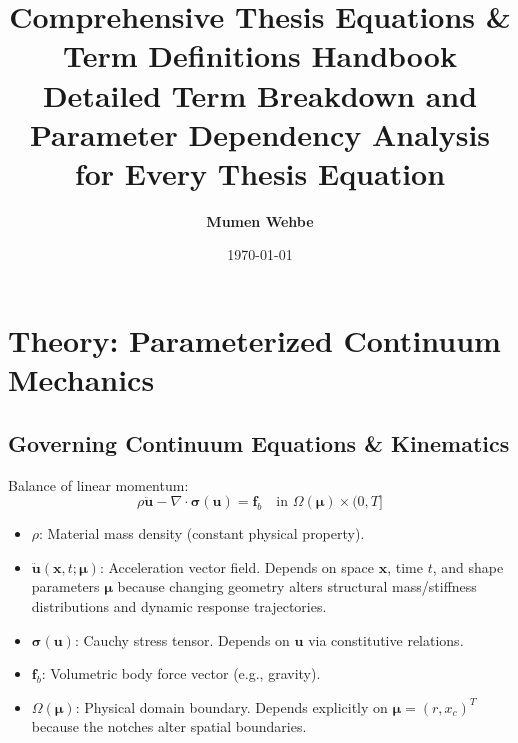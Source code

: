 \documentclass[12pt,a4paper,oneside]{report}
\title{
    \textbf{Comprehensive Thesis Equations \& Term Definitions Handbook} \\
    \large{Detailed Term Breakdown and Parameter Dependency Analysis for Every Thesis Equation}
}
\author{\textbf{Mumen Wehbe}}
\date{\today}
\newcommand{\vect}[1]{\mathbf{#1}}
\begin{document}
\maketitle

\tableofcontents
\newpage

\setcounter{chapter}{1}

\chapter{Theory: Parameterized Continuum Mechanics}
\label{ch:theory}

\section{Governing Continuum Equations \& Kinematics}

Balance of linear momentum:
\begin{equation}
    \rho \ddot{\vect{u}} - \nabla \cdot \boldsymbol{\sigma}(\vect{u}) = \vect{f}_b \quad \text{in } \Omega(\boldsymbol{\mu}) \times (0, T]
\end{equation}
\begin{tcolorbox}[colback=gray!5!white,colframe=gray!60!black,title={Term Definitions \& Parameter Dependencies}]
\begin{itemize}
    \item $\rho$: Material mass density (constant physical property).
    \item $\ddot{\vect{u}}(\vect{x}, t; \boldsymbol{\mu})$: Acceleration vector field. Depends on space $\vect{x}$, time $t$, and shape parameters $\boldsymbol{\mu}$ because changing geometry alters structural mass/stiffness distributions and dynamic response trajectories.
    \item $\boldsymbol{\sigma}(\vect{u})$: Cauchy stress tensor. Depends on $\vect{u}$ via constitutive relations.
    \item $\vect{f}_b$: Volumetric body force vector (e.g., gravity).
    \item $\Omega(\boldsymbol{\mu})$: Physical domain boundary. Depends explicitly on $\boldsymbol{\mu} = (r, x_c)^T$ because the notches alter spatial boundaries.
\end{itemize}
\end{tcolorbox}
\end{document}
